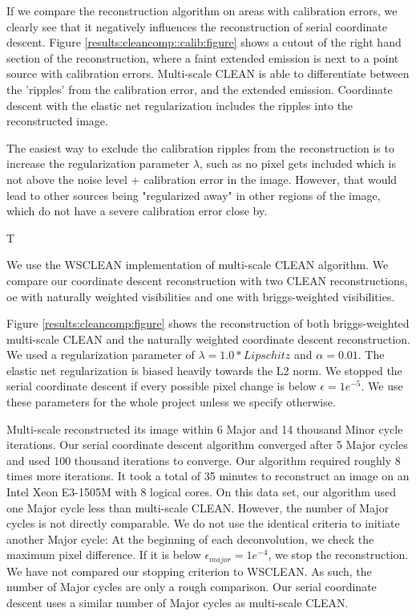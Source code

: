 If we compare the reconstruction algorithm on areas with calibration errors, we clearly see that it negatively influences the reconstruction of serial coordinate descent. Figure \ref{results:cleancomp::calib:figure} shows a cutout of the right hand section of the reconstruction, where a faint extended emission is next to a point source with calibration errors. Multi-scale CLEAN is able to differentiate between the 'ripples' from the calibration error, and the extended emission. Coordinate descent with the elastic net regularization includes the ripples into the reconstructed image. 

The easiest way to exclude the calibration ripples from the reconstruction is to increase the regularization parameter $\lambda$, such as no pixel gets included which is not above the noise level + calibration error in the image. However, that would lead to other sources being "regularized away" in other regions of the image, which do not have a severe calibration error close by. 


T

We use the WSCLEAN \cite{offringa2014wsclean} implementation of multi-scale CLEAN algorithm. We compare our coordinate descent reconstruction with two CLEAN reconstructions, oe with naturally weighted visibilities and one with briggs-weighted visibilities.



Figure \ref{results:cleancomp:figure} shows the reconstruction of both briggs-weighted multi-scale CLEAN and the naturally weighted coordinate descent reconstruction. We used a regularization parameter of $\lambda = 1.0 * Lipschitz$ and $\alpha = 0.01$. The elastic net regularization is biased heavily towards the L2 norm. We stopped the serial coordinate descent if every possible pixel change is below $\epsilon = 1e^{-5}$. We use these parameters for the whole project unless we specify otherwise.

Multi-scale reconstructed its image within 6 Major and 14 thousand Minor cycle iterations. Our serial coordinate descent algorithm converged after 5 Major cycles and used 100 thousand iterations to converge. Our algorithm required roughly 8 times more iterations. It took a total of 35 minutes to reconstruct an image on an Intel Xeon E3-1505M with 8 logical cores. On this data set, our algorithm used one Major cycle less than multi-scale CLEAN. However, the number of Major cycles is not directly comparable. We do not use the identical criteria to initiate another Major cycle: At the beginning of each deconvolution, we check the maximum pixel difference. If it is below $\epsilon_{major} = 1e^{-4}$, we stop the reconstruction. We have not compared our stopping criterion to WSCLEAN. As such, the number of Major cycles are only a rough comparison. Our serial coordinate descent uses a similar number of Major cycles as multi-scale CLEAN.

